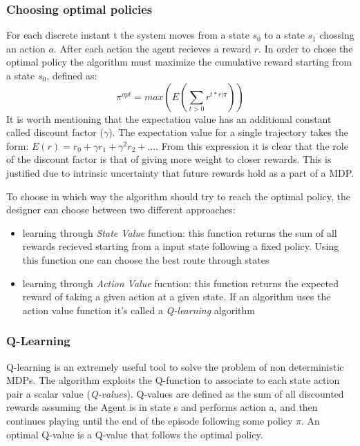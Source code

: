 \subsubsection{Choosing optimal policies}

For each discrete instant t the system moves from a state $s_{0}$ to a state $s_{1}$ chossing an action $a$. After each action the agent recieves a reward $r$. In order to chose the optimal policy the algorithm must maximize the cumulative reward starting from a state $s_{0}$, defined as: 
\begin{equation}
\pi^{opt} = max(E(\sum_{t>0}r^{t*r|\pi}))
\end{equation}
It is worth mentioning that the expectation value has an additional constant called discount factor ($\gamma$). The expectation value for a single trajectory takes the form: $E(r) = r_{0} + \gamma r_{1} + \gamma^{2} r_{2} + ...$. From this expression it is clear that the role of the discount factor is that of giving more weight to closer rewards. This is justified due to intrinsic uncertainty that future rewards hold as a part of a MDP.

To choose in which way the algorithm should try to reach the optimal policy, the designer can choose between two different approaches:

\begin{itemize}
    \item learning through \emph{State Value} function: this function returns the sum of all rewards recieved starting from a input state following a fixed policy. Using this function one can choose the best route through states
    \item learning through \emph{Action Value} fucntion: this function returns the expected reward of taking a given action at a given state. If an algorithm uses the action value function it's called a \emph{Q-learning} algorithm    
\end{itemize}

\subsubsection{Q-Learning}

Q-learning is an extremely useful tool to solve the problem of non deterministic MDPs. The algorithm exploits the Q-function to associate to each state action pair a scalar value (\emph{Q-values}). Q-values are defined as the sum of all discounted rewards assuming the Agent is in state s and performs action a, and then continues playing until the end of the episode following some policy $\pi$. An optimal Q-value is a Q-value that follows the optimal policy.

